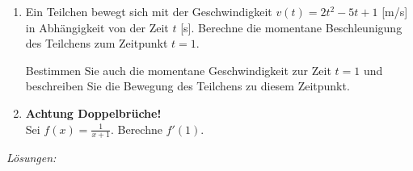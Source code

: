 \begin{ueb}
\begin{enumerate}
        \item Ein Teilchen bewegt sich mit der Geschwindigkeit $v(t) = 2t^2 - 5t + 1$ [m/s] in Abhängigkeit von der Zeit $t$ [s]. Berechne die momentane Beschleunigung des Teilchens zum Zeitpunkt $t=1$.
        
        Bestimmen Sie auch die momentane Geschwindigkeit zur Zeit $t=1$ und beschreiben Sie die Bewegung des Teilchens zu diesem Zeitpunkt.
      
        \item \textbf{Achtung Doppelbrüche!}\\
        Sei \( f(x) = \frac{1}{x + 1} \). Berechne \( f'(1) \).
    
      \end{enumerate}
\end{ueb}

\clearpage
\emph{Lösungen:}


